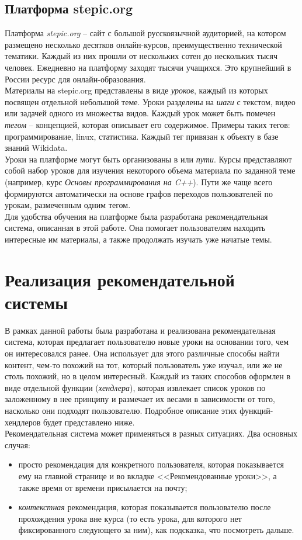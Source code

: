 \documentclass[12pt]{article}
\begin{document}
\subsection{Платформа stepic.org}
\indent Платформа \textit{stepic.org}\cite{stepic} -- сайт с большой русскоязычной аудиторией, на котором размещено несколько десятков онлайн-курсов, преимущественно технической тематики. Каждый из них прошли от нескольких сотен до нескольких тысяч человек. Ежедневно на платформу заходят тысячи учащихся. Это крупнейший в России ресурс для онлайн-образования.
\\\indent Материалы на stepic.org представлены в виде \textit{уроков}, каждый из которых посвящен отдельной небольшой теме. Уроки разделены на \textit{шаги} с текстом, видео или задачей одного из множества видов. Каждый урок может быть помечен \textit{тегом} -- концепцией, которая описывает его содержимое. Примеры таких тегов: программирование, linux, статистика. Каждый тег привязан к объекту в базе знаний Wikidata\cite{wikidata}.
\\\indent Уроки на платформе могут быть организованы в  или \textit{пути}. Курсы представляют собой набор уроков для изучения некоторого объема материала по заданной теме (например, курс \textit{Основы программирования на C++}). Пути же чаще всего формируются автоматически на основе графов переходов пользователей по урокам, размеченным одним тегом.
\\\indent Для удобства обучения на платформе была разработана рекомендательная система, описанная в этой работе. Она помогает пользователям находить интересные им материалы, а также продолжать изучать уже начатые темы.


\section{Реализация рекомендательной системы}
\indent В рамках данной работы была разработана и реализована рекомендательная система, которая предлагает пользователю новые уроки на основании того, чем он интересовался ранее. Она использует для этого различные способы найти контент, чем-то похожий на тот, который пользователь уже изучал, или же не столь похожий, но в целом интересный. Каждый из таких способов оформлен в виде отдельной функции (\textit{хендлера}), которая извлекает список уроков по заложенному в нее принципу и размечает их весами в зависимости от того, насколько они подходят пользователю. Подробное описание этих функций-хендлеров будет представлено ниже.
\\\indent Рекомендательная система может применяться в разных ситуациях. Два основных случая:
\begin{itemize}
    \item просто рекомендация для конкретного пользователя, которая показывается ему на главной странице и во вкладке <<Рекомендованные уроки>>, а также время от времени присылается на почту;
    \item \textit{контекстная} рекомендация, которая показывается пользователю после прохождения урока вне курса (то есть урока, для которого нет фиксированного следующего за ним), как подсказка, что посмотреть дальше.
\end{itemize}
\end{document}
